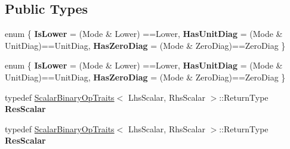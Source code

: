 \subsection*{Public Types}
\begin{DoxyCompactItemize}
\item 
\mbox{\label{struct_eigen_1_1internal_1_1packed__triangular__matrix__vector__product_3_01_index_00_01_mode_00bec3a0963b0a27d1079bfcbb3d0202cf_a00573c7246a625a4b0c679182097e194}} 
enum \{ {\bfseries Is\+Lower} = (Mode \& Lower) ==Lower, 
{\bfseries Has\+Unit\+Diag} = (Mode \& Unit\+Diag)==Unit\+Diag, 
{\bfseries Has\+Zero\+Diag} = (Mode \& Zero\+Diag)==Zero\+Diag
 \}
\item 
\mbox{\label{struct_eigen_1_1internal_1_1packed__triangular__matrix__vector__product_3_01_index_00_01_mode_00bec3a0963b0a27d1079bfcbb3d0202cf_a56178b9dc30f80a016239927efd7e169}} 
enum \{ {\bfseries Is\+Lower} = (Mode \& Lower) ==Lower, 
{\bfseries Has\+Unit\+Diag} = (Mode \& Unit\+Diag)==Unit\+Diag, 
{\bfseries Has\+Zero\+Diag} = (Mode \& Zero\+Diag)==Zero\+Diag
 \}
\item 
\mbox{\label{struct_eigen_1_1internal_1_1packed__triangular__matrix__vector__product_3_01_index_00_01_mode_00bec3a0963b0a27d1079bfcbb3d0202cf_abbfe91848a678b64a7f020016b43c80e}} 
typedef \hyperlink{group___core___module_struct_eigen_1_1_scalar_binary_op_traits}{Scalar\+Binary\+Op\+Traits}$<$ Lhs\+Scalar, Rhs\+Scalar $>$\+::Return\+Type {\bfseries Res\+Scalar}
\item 
\mbox{\label{struct_eigen_1_1internal_1_1packed__triangular__matrix__vector__product_3_01_index_00_01_mode_00bec3a0963b0a27d1079bfcbb3d0202cf_abbfe91848a678b64a7f020016b43c80e}} 
typedef \hyperlink{group___core___module_struct_eigen_1_1_scalar_binary_op_traits}{Scalar\+Binary\+Op\+Traits}$<$ Lhs\+Scalar, Rhs\+Scalar $>$\+::Return\+Type {\bfseries Res\+Scalar}
\end{DoxyCompactItemize}

